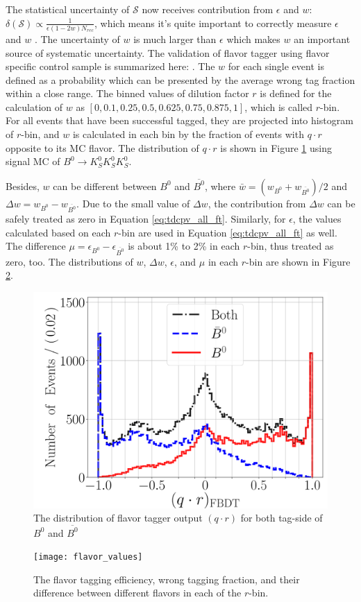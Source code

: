 The statistical uncertainty of $\mathcal{S}$ now receives contribution from $\epsilon$ and $w$: $\delta(\mathcal{S}) \propto \frac{1}{\epsilon (1-2w)N_{rec}}$, which means it's quite important to correctly measure $\epsilon$ and $w$ . The uncertainty of $w$ is much larger than $\epsilon$ which makes $w$ an important source of systematic uncertainty. The validation of flavor tagger using flavor specific control sample is summarized here: \cite{flavortagger}. The $w$ for each single event is defined as a probability which can be presented by the average wrong tag fraction within a close range. The binned values of dilution factor $r$ is defined for the calculation of $w$ as $[0,0.1,0.25,0.5,0.625,0.75,0.875,1]$, which is called $r$-bin. For all events that have been successful tagged, they are projected into histogram of $r$-bin, and $w$ is calculated in each bin by the fraction of events with $q\cdot r$ opposite to its MC flavor. The distribution of $q\cdot r$ is shown in Figure \ref{fig:ft_qr} using signal MC of $B^0 \to K_S^0  K_S^0  K_S^0$. 

Besides, $w$ can be different between $B^0$ and $\overline{B^0}$, where
$\bar{w} = (w_{B^0}+w_{\overline{B^0}})/2$ and $\Delta w = w_{B^0}-w_{\overline{B^0}}$. Due to the small value of $\Delta w$, the contribution from $\Delta w$ can be safely treated as zero in Equation \ref{eq:tdcpv_all_ft}. Similarly, for $\epsilon$, the values calculated based on each $r$-bin are used in Equation \ref{eq:tdcpv_all_ft} as well. The difference $\mu = \epsilon_{B^0}-\epsilon_{\overline{B^0}} $ is about 1\% to 2\% in each $r$-bin, thus treated as zero, too. The distributions of $w$, $\Delta w$, $\epsilon$, and $\mu$ in each $r$-bin are shown in Figure \ref{fig:ft_wtag}.
 \begin{figure}[htpb]
 	\centering
 	\includegraphics[width=0.7\linewidth]{figures/qr}
 	\caption{The distribution of flavor tagger output $(q\cdot r)$ for both tag-side of $B^0$ and $\overline{B^0}$}
 	\label{fig:ft_qr}
 	\end{figure}
 \begin{figure}[htpb]
 	\texttt{[image: flavor\_values]}
 	\caption{The flavor tagging efficiency, wrong tagging fraction, and their difference between different flavors in each of the $r$-bin.}
 	\label{fig:ft_wtag}
 \end{figure}

